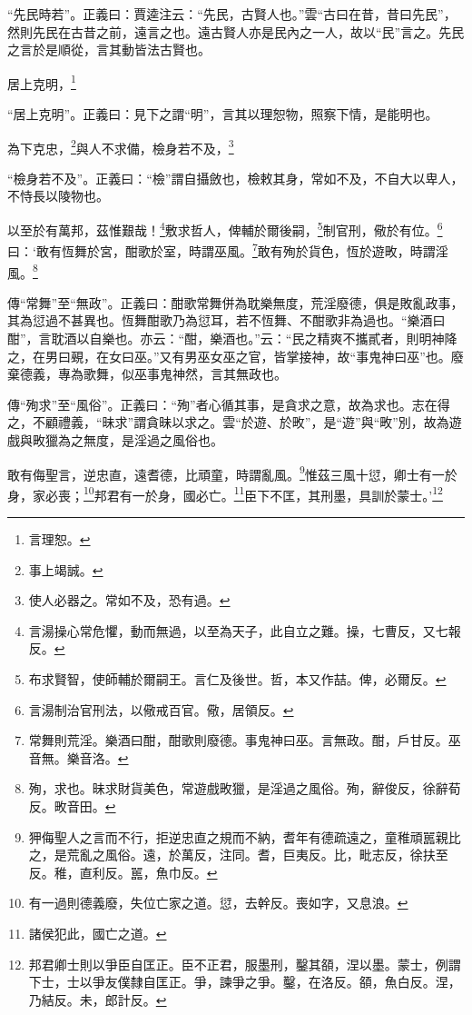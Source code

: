 {\noindent\shu{}\fzkt “先民時若”。正義曰：賈逵注云：“先民，古賢人也。”雲“古曰在昔，昔曰先民”，然則先民在古昔之前，遠言之也。遠古賢人亦是民內之一人，故以“民”言之。先民之言於是順從，言其動皆法古賢也。 \par}

居上克明，\footnote{言理恕。}

{\noindent\shu{}\fzkt “居上克明”。正義曰：見下之謂“明”，言其以理恕物，照察下情，是能明也。 \par}

為下克忠，\footnote{事上竭誠。}與人不求備，檢身若不及，\footnote{使人必器之。常如不及，恐有過。}

{\noindent\shu{}\fzkt “檢身若不及”。正義曰：“檢”謂自攝斂也，檢敕其身，常如不及，不自大以卑人，不恃長以陵物也。 \par}

以至於有萬邦，茲惟艱哉！\footnote{言湯操心常危懼，動而無過，以至為天子，此自立之難。操，七曹反，又七報反。}敷求哲人，俾輔於爾後嗣，\footnote{布求賢智，使師輔於爾嗣王。言仁及後世。哲，本又作喆。俾，必爾反。}制官刑，儆於有位。\footnote{言湯制治官刑法，以儆戒百官。儆，居領反。}曰：‘敢有恆舞於宮，酣歌於室，時謂巫風。\footnote{常舞則荒淫。樂酒曰酣，酣歌則廢德。事鬼神曰巫。言無政。酣，戶甘反。巫音無。樂音洛。}敢有殉於貨色，恆於遊畋，時謂淫風。\footnote{殉，求也。昧求財貨美色，常遊戲畋獵，是淫過之風俗。殉，辭俊反，徐辭荀反。畋音田。}


{\noindent\zhuan{}\fzbyks 傳“常舞”至“無政”。正義曰：酣歌常舞併為耽樂無度，荒淫廢德，俱是敗亂政事，其為愆過不甚異也。恆舞酣歌乃為愆耳，若不恆舞、不酣歌非為過也。“樂酒曰酣”，言耽酒以自樂也。亦云：“酣，樂酒也。”云：“民之精爽不攜貳者，則明神降之，在男曰覡，在女曰巫。”又有男巫女巫之官，皆掌接神，故“事鬼神曰巫”也。廢棄德義，專為歌舞，似巫事鬼神然，言其無政也。 \par}

{\noindent\zhuan{}\fzbyks 傳“殉求”至“風俗”。正義曰：“殉”者心循其事，是貪求之意，故為求也。志在得之，不顧禮義，“昧求”謂貪昧以求之。雲“於遊、於畋”，是“遊”與“畋”別，故為遊戲與畋獵為之無度，是淫過之風俗也。 \par}

敢有侮聖言，逆忠直，遠耆德，比頑童，時謂亂風。\footnote{狎侮聖人之言而不行，拒逆忠直之規而不納，耆年有德疏遠之，童稚頑嚚親比之，是荒亂之風俗。遠，於萬反，注同。耆，巨夷反。比，毗志反，徐扶至反。稚，直利反。嚚，魚巾反。}惟茲三風十愆，卿士有一於身，家必喪；\footnote{有一過則德義廢，失位亡家之道。愆，去幹反。喪如字，又息浪。}邦君有一於身，國必亡。\footnote{諸侯犯此，國亡之道。}臣下不匡，其刑墨，具訓於蒙士。’\footnote{邦君卿士則以爭臣自匡正。臣不正君，服墨刑，鑿其頟，涅以墨。蒙士，例謂下士，士以爭友僕隸自匡正。爭，諫爭之爭。鑿，在洛反。頟，魚白反。涅，乃結反。未，郎計反。}

